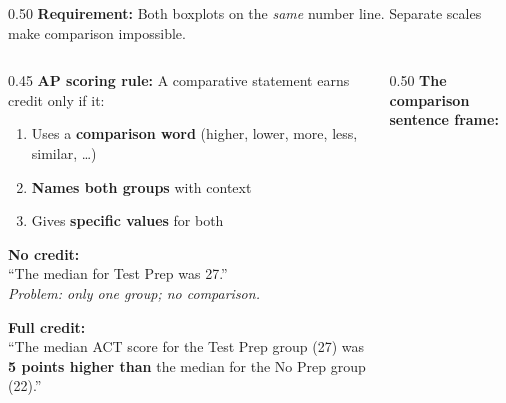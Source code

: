 \documentclass[aspectratio=169, 11pt]{beamer}
\begin{document}
{\begin{frame}[t, plain]
\begin{minipage}{0.9\textwidth}
\begin{columns}[T]
\begin{column}{0.50\textwidth}
      \vspace{0.4em}
      {\color{redacc}\textbf{Requirement:} Both boxplots on
      the \textit{same} number line. Separate scales
      make comparison impossible.}
    \end{column}
    \end{columns}
  \end{minipage}
\end{frame}
}

{
\begin{frame}[t, plain]
  \vspace{0.8em}%
  \hspace{0.55cm}%
  \begin{minipage}{0.9\textwidth}
    \small
    \begin{columns}[T]
    \begin{column}{0.45\textwidth}
      \textbf{AP scoring rule:} A comparative statement earns credit only if it:
      \begin{enumerate}\setlength{\itemsep}{0.4em}
        \item[a.] Uses a \textbf{comparison word}
                  (higher, lower, more, less, similar, \ldots)
        \item[b.] \textbf{Names both groups} with context
        \item[c.] Gives \textbf{specific values} for both
      \end{enumerate}

      \vspace{0.6em}
      {\color{redacc}\textbf{No credit:}}\\
      ``The median for Test Prep was 27.''\\[0.3em]
      \textit{Problem: only one group; no comparison.}

      \vspace{0.4em}
      {\color{navy}\textbf{Full credit:}}\\
      ``The median ACT score for the Test Prep group
      (27) was \textbf{5 points higher than} the median
      for the No Prep group (22).''
    \end{column}
    \begin{column}{0.50\textwidth}
      \textbf{The comparison sentence frame:}


\end{column}
\end{columns}
\end{minipage}
\end{frame}}
\end{document}
